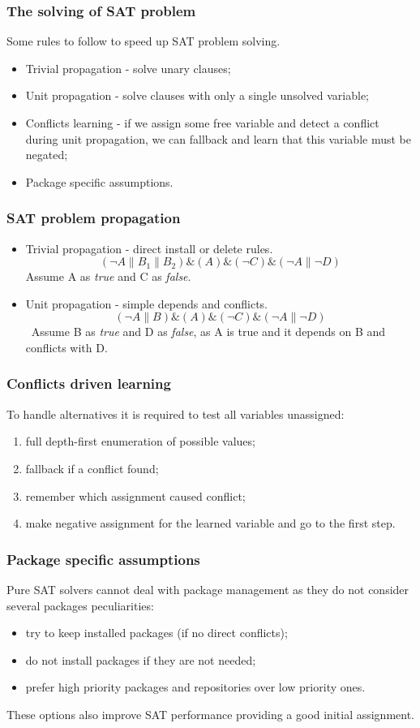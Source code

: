 \documentclass{beamer}
\begin{document}
\begin{frame}
\frametitle{The solving of SAT problem}

Some rules to follow to speed up SAT problem solving.
\begin{itemize}
  \item Trivial propagation - solve unary clauses;
  \item Unit propagation - solve clauses with only a single unsolved variable;
  \item Conflicts learning - if we assign some free variable and detect a
  conflict during unit propagation, we can fallback and learn that this variable
  must be negated;
  \item Package specific assumptions. 
\end{itemize}
\end{frame}

\begin{frame}
\frametitle{SAT problem propagation}
\begin{itemize}
  \item Trivial propagation - direct install or delete rules.
  \bigskip
  \[(\neg A \| B_1 \| B_2) \& (A) \&(\neg C) \& (\neg A \| \neg D)\]
  \bigskip
  Assume A as \textit{true} and C as \textit{false}.
  \pause
  \item Unit propagation - simple depends and conflicts.
  \bigskip
  \[(\neg A \| B) \& (A) \&(\neg C) \& (\neg A \| \neg D)\]
  \
  Assume B as \textit{true} and D as \textit{false}, as A is true and it
  depends on B and conflicts with D.
\end{itemize}
\end{frame}

\begin{frame}
\frametitle{Conflicts driven learning}
To handle alternatives it is required to test all variables unassigned:
\begin{enumerate}
  \item full depth-first enumeration of possible values;
  \item fallback if a conflict found;
  \item remember which assignment caused conflict;
  \item make negative assignment for the learned variable and go to the first
  step.
\end{enumerate}
\end{frame}

\begin{frame}
\frametitle{Package specific assumptions}
Pure SAT solvers cannot deal with package management as they do not consider
several packages peculiarities:
\begin{itemize}
  \item try to keep installed packages (if no direct conflicts);
  \item do not install packages if they are not needed;
  \item prefer high priority packages and repositories over low priority ones.
\end{itemize}
These options also improve SAT performance providing a good initial assignment.
\end{frame}
\end{document}
